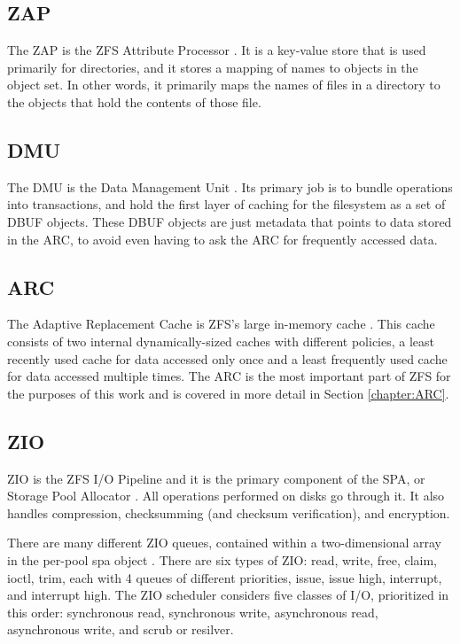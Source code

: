 \subsection{ZAP}
The ZAP is the ZFS Attribute Processor \cite{dawidek_closer_2008}. 
It is a key-value store that is used primarily for directories, and it stores a mapping of names to objects in the object set.
In other words, it primarily maps the names of files in a directory to the objects that hold the contents of those file.

\subsection{DMU}
The DMU is the Data Management Unit \cite{ahrens_read_write}. 
Its primary job is to bundle operations into transactions, and hold the first layer of caching for the filesystem as a set of DBUF objects. 
These DBUF objects are just metadata that points to data stored in the ARC, to avoid even having to ask the ARC for frequently accessed data.

\subsection{ARC}
The Adaptive Replacement Cache is ZFS's large in-memory cache \cite{ahrens_openzfs_basics, ahrens_read_write}.
This cache consists of two internal dynamically-sized caches with different policies, a least recently used cache
for data accessed only once and a least frequently used cache for data accessed multiple times.
The ARC is the most important part of ZFS for the purposes of this work and is covered in more detail in Section \ref{chapter:ARC}.

\subsection{ZIO}
ZIO is the ZFS I/O Pipeline and it is the primary component of the SPA, or Storage Pool Allocator \cite{ahrens_read_write}.
All operations performed on disks go through it. 
It also handles compression, checksumming (and checksum verification), and encryption.

There are many different ZIO queues, contained within a two-dimensional array in the per-pool spa object 
\cite[{module/zfs/spa.c}]{zfs}.
There are six  types of ZIO: read, write, free, claim, ioctl, trim, each with 4 queues of different priorities,
issue, issue high, interrupt, and interrupt high.
The ZIO scheduler considers five classes of I/O, prioritized in this order: synchronous read, synchronous write, asynchronous read, asynchronous write, and scrub or resilver.

